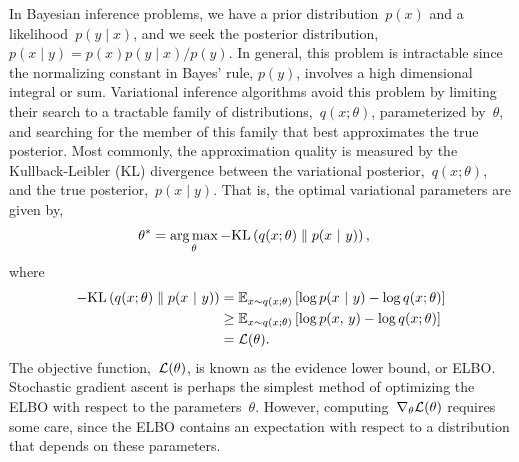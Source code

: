 \documentclass{article}
\begin{document}
In Bayesian inference problems, we have a prior distribution~$p(x)$
and a likelihood~$p(y \mid x)$, and
we seek the posterior distribution,~${p(x \mid y) = p(x) p(y \mid x) / p(y)}$.
In general, this problem is intractable since the normalizing constant
in Bayes' rule, $p(y)$, involves a high dimensional integral or sum.
Variational inference algorithms avoid this problem by limiting their
search to a tractable family of distributions,~$q(x; \theta)$,
parameterized by~$\theta$, and searching for the member of this family
that best approximates the true posterior. Most commonly, the
approximation quality is measured by the Kullback-Leibler (KL)
divergence between the variational posterior,~$q(x; \theta)$, and the
true posterior,~$p(x \mid y)$. That is, the optimal variational
parameters are given by,
\begin{align}
  \theta^* &= \operatorname*{arg\,max}_\theta -\textrm{KL}\left(q(x; \theta)\;\|\;p(x ~\vert~ y)\right),
\end{align}
where
\begin{align}
  -\textrm{KL}\left(q(x; \theta)\;\|\;p(x ~\vert~ y)\right) &= \mathbb{E}_{x \sim q(x; \theta)}
  \left[ \log p(x ~\vert~ y) - \log q(x; \theta) \right] \\
  &\geq \mathbb{E}_{x \sim q(x; \theta)}
  \left[ \log p(x, \, y) - \log q(x; \theta) \right] \\
  &= \mathcal{L}(\theta).
\end{align}
The objective function,~$\mathcal{L}(\theta)$, is known as the evidence lower bound, or ELBO.
Stochastic gradient ascent is
perhaps the simplest method of optimizing the ELBO with respect to
the parameters~$\theta$.
However, computing~$\nabla_\theta \mathcal{L}(\theta)$ requires some care,
since the ELBO contains an expectation with respect to a distribution
that depends on these parameters.
\end{document}
